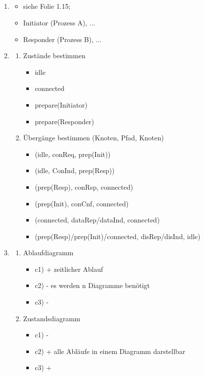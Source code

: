 \subsection{}
\begin{enumerate}
	\item
	\begin{itemize}
		\item siehe Folie 1.15; 
		\item Initiator (Prozess A), ...
		\item Responder (Prozess B), ...
	\end{itemize}
	\item
	\begin{enumerate}
		\item Zustände bestimmen
		\begin{itemize}
			\item idle
			\item connected
			\item prepare(Initiator)
			\item prepare(Responder)
		\end{itemize}
		\item Übergänge bestimmen (Knoten, Pfad, Knoten)
		\begin{itemize}
			\item (idle, conReq, prep(Init))
			\item (idle, ConInd, prep(Resp))
			\item (prep(Resp), conRsp, connected)
			\item (prep(Init), conCnf, connected)
			\item (connected, dataRep/dataInd, connected) 
			\item (prep(Resp)/prep(Init)/connected, disRep/disInd, idle)
		\end{itemize}
	\end{enumerate}
	\item
	\begin{enumerate}
		\item Ablaufdiagramm
		\begin{itemize}
			\item c1) + zeitlicher Ablauf
			\item c2) - es werden n Diagramme benötigt
			\item c3) - 
		\end{itemize}
		\item Zustandsdiagramm
		\begin{itemize}
			\item c1) - 
			\item c2) + alle Abläufe in einem Diagramm darstellbar
			\item c3) + 
		\end{itemize}
	\end{enumerate}
\end{enumerate}

